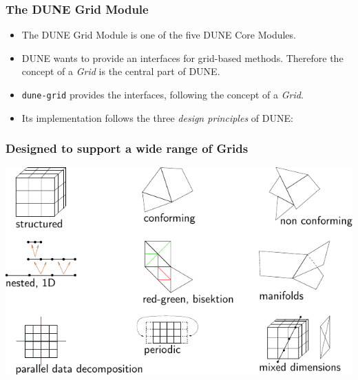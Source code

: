 \documentclass[aspectratio=169,11pt]{beamer}
\theoremstyle{definition}
\begin{document}
\begin{frame} \frametitle{The DUNE Grid Module}
  \begin{itemize}
  \item The DUNE Grid Module is one of the five DUNE Core Modules.

  \item DUNE wants to provide an interfaces for grid-based
    methods. Therefore the concept of a \emph{Grid} is the central part
    of DUNE.

  \item \texttt{dune-grid} provides the interfaces, following the concept
    of a \emph{Grid}.

  \item Its implementation follows the three \emph{design principles} of
    DUNE:

  \end{itemize}
\end{frame}

\begin{frame}
  \frametitle<presentation>{Designed to support a wide range of Grids}
  \centering
  \includegraphics[width=0.8\linewidth]{grids}
\end{frame}
\end{document}
